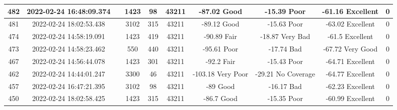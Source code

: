 \begin{longtable*}{|c|c|c|c|c|c|c|c|c|c|}
482&2022-02-24 16:48:09.374&&1423&98&43211& -87.02    Good        & -15.39    Poor        & -61.16    Excellent   & 0\\\hline
{}481&2022-02-24 18:02:53.438&&3102&315&43211& -89.12    Good        & -15.63    Poor        & -63.02    Excellent   & 0\\\hline
{}474&2022-02-24 14:58:19.091&&1423&419&43211& -90.89    Fair        & -18.87    Very Bad    & -61.5     Excellent   & 0\\\hline
{}473&2022-02-24 14:58:23.462&&550&440&43211& -95.61    Poor        & -17.74    Bad         & -67.72    Very Good   & 0\\\hline
{}467&2022-02-24 14:56:44.078&&1423&301&43211& -92.2     Fair        & -15.43    Poor        & -64.71    Excellent   & 0\\\hline
{}462&2022-02-24 14:44:01.247&&3300&46&43211& -103.18   Very Poor   & -29.21    No Coverage & -64.77    Excellent   & 0\\\hline
{}457&2022-02-24 16:47:21.395&&3102&98&43211& -89       Good        & -16.17    Bad         & -62.23    Excellent   & 0\\\hline
{}450&2022-02-24 18:02:58.425&&1423&315&43211& -86.7     Good        & -15.35    Poor        & -60.99    Excellent   & 0\\\hline

\end{longtable*}
